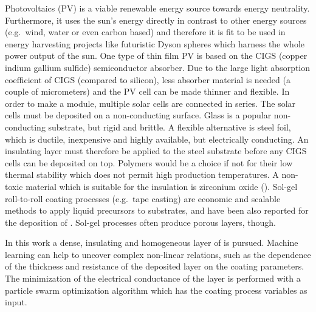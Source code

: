 Photovoltaics (PV) is a viable renewable energy source towards energy neutrality.
Furthermore, 
it uses the sun's energy directly in contrast to other energy sources (e.g.\ wind, water or even carbon based) and therefore 
it is fit to be used in energy harvesting projects like futuristic Dyson spheres\cite{dyson1960search, kardashev1964transmission} which harness the whole power output of the sun.
%
One type  of thin film PV is based on the CIGS (copper indium gallium sulfide) semiconductor absorber\cite{Vasekar2010}. 
Due to the large light absorption coefficient of CIGS (compared to silicon), less absorber material is needed (a couple of micrometers) and the PV cell can be made thinner and flexible. 
In order to make a module, multiple solar cells are connected in series. 
The solar cells must be deposited on a non-conducting surface.
Glass is a popular non-conducting substrate, but rigid and brittle. 
A flexible alternative is steel foil, which is ductile, inexpensive and highly available, but electrically conducting. 
An insulating layer must therefore be applied to the steel substrate before any CIGS cells can be deposited on top.
Polymers would be a choice if not for their low thermal stability which does not permit high production temperatures.
A non-toxic material which is suitable for the insulation is zirconium oxide (). 
Sol-gel roll-to-roll coating processes (e.g.\ tape casting) are economic and scalable methods to apply liquid precursors to substrates, and have been also reported for the deposition of \cite{yeo1998design,michalek2015comparison}.
Sol-gel processes often produce porous layers, though. 

In this work a dense, insulating and homogeneous layer of  is pursued. 
Machine learning can help to uncover complex non-linear relations, such as the 
dependence of the thickness and resistance of the deposited layer on the coating parameters.
The minimization of the electrical conductance of the layer is performed with a particle swarm optimization 
algorithm which has the coating process variables as input. 


